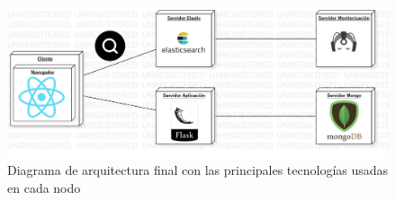 \begin{figure}[ht]
	
	\centering
	\includegraphics[width=\linewidth]{imagenes/achitecture}
	\caption{Diagrama de arquitectura final con las principales tecnologías usadas en cada nodo}
\end{figure}